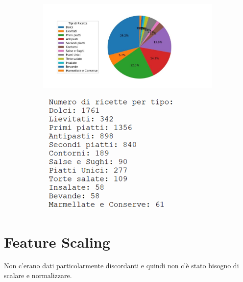 \documentclass[12pt]{report}
\begin{document}
\begin{figure}[H]
  \centering
  \begin{subfigure}[b]{0.9\linewidth}
    \includegraphics[width=\linewidth]{img/img8.jpg}
  \end{subfigure}
  \begin{subfigure}[b]{0.5\linewidth}
    \includegraphics[width=\linewidth]{img/img9.jpg}
  \end{subfigure}
\end{figure}
\section{Feature Scaling}
Non c’erano dati particolarmente discordanti e quindi non c’è stato bisogno di scalare e normalizzare. 
\end{document}
